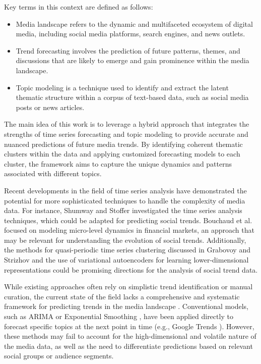 Key terms in this context are defined as follows:

\begin{itemize}
\item Media landscape refers to the dynamic and multifaceted ecosystem of digital media, including social media platforms, search engines, and news outlets.
\item Trend forecasting involves the prediction of future patterns, themes, and discussions that are likely to emerge and gain prominence within the media landscape.
\item Topic modeling is a technique used to identify and extract the latent thematic structure within a corpus of text-based data, such as social media posts or news articles.
\end{itemize}

The main idea of this work is to leverage a hybrid approach that integrates the strengths of time series forecasting and topic modeling to provide accurate and nuanced predictions of future media trends. By identifying coherent thematic clusters within the data and applying customized forecasting models to each cluster, the framework aims to capture the unique dynamics and patterns associated with different topics.


Recent developments in the field of time series analysis have demonstrated the potential for more sophisticated techniques to handle the complexity of media data. For instance, Shumway and Stoffer \cite{Shumway2000} investigated the time series analysis techniques, which could be adapted for predicting social trends. Bouchaud et al. \cite{Bouchaud2018} focused on modeling micro-level dynamics in financial markets, an approach that may be relevant for understanding the evolution of social trends. Additionally, the methods for quasi-periodic time series clustering discussed in Grabovoy and Strizhov \cite{Grabovoy2019} and the use of variational autoencoders \cite{Das2020VAE} for learning lower-dimensional representations could be promising directions for the analysis of social trend data.

While existing approaches often rely on simplistic trend identification or manual curation, the current state of the field lacks a comprehensive and systematic framework for predicting trends in the media landscape \cite{rappaz2019dynamic}. Conventional models, such as ARIMA \cite{holt2004forecasting}  or Exponential Smoothing \cite{Gardner1985}, have been applied directly to forecast specific topics at the next point in time 
 (e.g., Google Trends \cite{choi2012predicting}). However, these methods may fail to account for the high-dimensional and volatile nature of the media data, as well as the need to differentiate predictions based on relevant social groups or audience segments.

